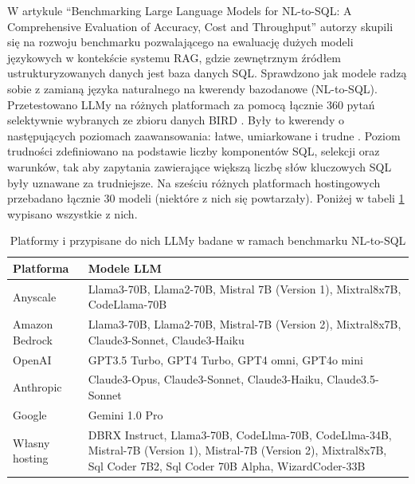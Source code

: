     W artykule \enquote{Benchmarking Large Language Models for NL-to-SQL: A Comprehensive Evaluation of Accuracy, Cost and Throughput} \cite{art3_structured2024} autorzy skupili się na rozwoju benchmarku pozwalającego na ewaluację dużych modeli językowych w kontekście systemu RAG, gdzie zewnętrznym źródłem ustrukturyzowanych danych jest baza danych SQL. Sprawdzono jak modele radzą sobie z zamianą języka naturalnego na kwerendy bazodanowe (NL-to-SQL). Przetestowano LLMy na różnych platformach za pomocą łącznie 360 pytań selektywnie wybranych ze zbioru danych BIRD \cite{bird2018}. Były to kwerendy o następujących poziomach zaawansowania: łatwe, umiarkowane i trudne \cite{3_levels_of_questions_difficulty2023}. Poziom trudności zdefiniowano na podstawie liczby komponentów SQL, selekcji oraz warunków, tak aby zapytania zawierające większą liczbę słów kluczowych SQL były uznawane za trudniejsze. Na sześciu różnych platformach hostingowych przebadano łącznie 30 modeli (niektóre z nich się powtarzały). Poniżej w tabeli \ref{nltosql_modele} wypisano wszystkie z nich.    

    \begin{table}[h]
        \centering
        \caption{ Platformy i przypisane do nich LLMy badane w ramach benchmarku NL-to-SQL \cite{art3_structured2024}}
        \begin{tabularx}{\textwidth}{|p{3cm}|X|}
        \hline
        \textbf{Platforma} & \textbf{Modele LLM} \\
        \hline
        Anyscale & Llama3-70B, Llama2-70B, Mistral 7B (Version 1), Mixtral8x7B, CodeLlama-70B  \\ \hline
        
        Amazon Bedrock & Llama3-70B, Llama2-70B, Mistral-7B (Version 2), Mixtral8x7B, Claude3-Sonnet, Claude3-Haiku  \\ \hline
        
        OpenAI  & GPT3.5 Turbo, GPT4 Turbo, GPT4 omni, GPT4o mini  \\ \hline

        Anthropic & Claude3-Opus, Claude3-Sonnet, Claude3-Haiku, Claude3.5-Sonnet  \\ \hline

        Google & Gemini 1.0 Pro  \\ \hline

        Własny hosting & DBRX Instruct, Llama3-70B, CodeLlma-70B, CodeLlma-34B, Mistral-7B (Version 1), Mistral-7B (Version 2), Mixtral8x7B, Sql Coder 7B2, Sql Coder 70B Alpha, WizardCoder-33B  \\ \hline
        \end{tabularx}
        \label{nltosql_modele}
    \end{table}

